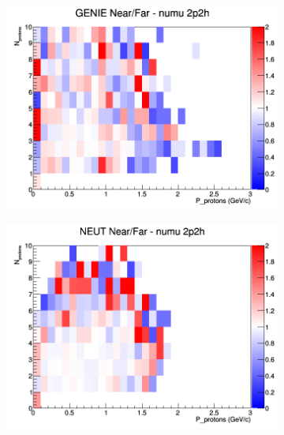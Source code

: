 \documentclass[12pt]{article}
\begin{document}
\begin{figure}[h]
\centering
\begin{subfigure}[b]{0.32\textwidth}
\includegraphics[width=\linewidth]{N_P/nominal/protons/ratios/2p2h_GENIE_numu_NF_N_P.png}
\end{subfigure}
\begin{subfigure}[b]{0.32\textwidth}
\includegraphics[width=\linewidth]{N_P/nominal/protons/ratios/2p2h_NEUT_numu_NF_N_P.png}
\end{subfigure}
\begin{subfigure}[b]{0.32\textwidth}

\end{subfigure}
\end{figure}
\end{document}
